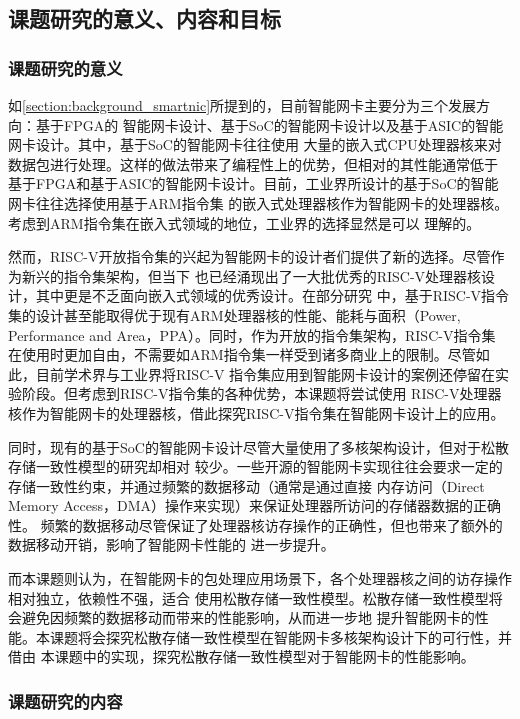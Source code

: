 \subsection{课题研究的意义、内容和目标}

\subsubsection{课题研究的意义}
\label{section:paper_making_sense}

如\autoref{section:background_smartnic}所提到的，目前智能网卡主要分为三个发展方向：基于FPGA的
智能网卡设计、基于SoC的智能网卡设计以及基于ASIC的智能网卡设计。其中，基于SoC的智能网卡往往使用
大量的嵌入式CPU处理器核来对数据包进行处理。这样的做法带来了编程性上的优势，但相对的其性能通常低于
基于FPGA和基于ASIC的智能网卡设计。目前，工业界所设计的基于SoC的智能网卡往往选择使用基于ARM指令集
的嵌入式处理器核作为智能网卡的处理器核。考虑到ARM指令集在嵌入式领域的地位，工业界的选择显然是可以
理解的。

然而，RISC-V开放指令集的兴起为智能网卡的设计者们提供了新的选择。尽管作为新兴的指令集架构，但当下
也已经涌现出了一大批优秀的RISC-V处理器核设计，其中更是不乏面向嵌入式领域的优秀设计。在部分研究
中，基于RISC-V指令集的设计甚至能取得优于现有ARM处理器核的性能、能耗与面积（Power, Performance
and Area，PPA）\cite{asanovic2014instruction}。同时，作为开放的指令集架构，RISC-V指令集
在使用时更加自由，不需要如ARM指令集一样受到诸多商业上的限制。尽管如此，目前学术界与工业界将RISC-V
指令集应用到智能网卡设计的案例还停留在实验阶段。但考虑到RISC-V指令集的各种优势，本课题将尝试使用
RISC-V处理器核作为智能网卡的处理器核，借此探究RISC-V指令集在智能网卡设计上的应用。

同时，现有的基于SoC的智能网卡设计尽管大量使用了多核架构设计，但对于松散存储一致性模型的研究却相对
较少。一些开源的智能网卡实现往往会要求一定的存储一致性约束，并通过频繁的数据移动（通常是通过直接
内存访问（Direct Memory Access，DMA）操作来实现）来保证处理器所访问的存储器数据的正确性\cite{di2020pspin}。
频繁的数据移动尽管保证了处理器核访存操作的正确性，但也带来了额外的数据移动开销，影响了智能网卡性能的
进一步提升。

而本课题则认为，在智能网卡的包处理应用场景下，各个处理器核之间的访存操作相对独立，依赖性不强，适合
使用松散存储一致性模型。松散存储一致性模型将会避免因频繁的数据移动而带来的性能影响，从而进一步地
提升智能网卡的性能。本课题将会探究松散存储一致性模型在智能网卡多核架构设计下的可行性，并借由
本课题中的实现，探究松散存储一致性模型对于智能网卡的性能影响。

\subsubsection{课题研究的内容}

